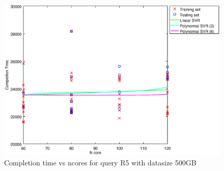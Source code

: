 
\begin {figure}[hbtp]
\centering
\includegraphics[width=\textwidth]{output/R5_500_ONLY_1_LINEAR_NCORE/plot_R5_500_bestmodels.eps}
\caption{Completion time vs ncores for query R5 with datasize 500GB}
\label{fig:only_1_linear_R5_500}
\end {figure}
